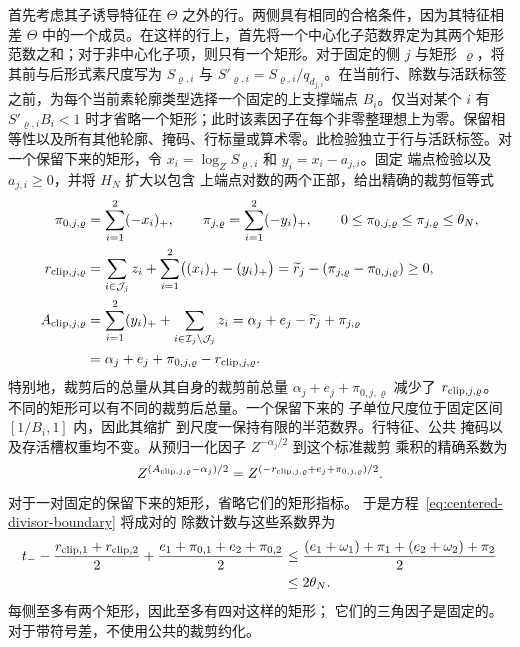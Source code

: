 \documentclass[11pt,a4paper]{article}
\numberwithin{equation}{section}
\numberwithin{figure}{section}
\theoremstyle{definition}
\theoremstyle{remark}
\begin{document}
首先考虑其子诱导特征在 \(\Theta\) 之外的行。两侧具有相同的合格条件，因为其特征相差 \(\Theta\) 中的一个成员。在这样的行上，首先将一个中心化子范数界定为其两个矩形范数之和；对于非中心化子项，则只有一个矩形。对于固定的侧 \(j\) 与矩形 \(\varrho\)，将其前与后形式素尺度写为 \(S_{\varrho,i}\) 与
\(S'_{\varrho,i}=S_{\varrho,i}/q_{d_{j,i}}\)。在当前行、除数与活跃标签之前，为每个当前素轮廓类型选择一个固定的上支撑端点 \(B_i\)。仅当对某个 \(i\) 有 \(S'_{\varrho,i}B_i<1\) 时才省略一个矩形；此时该素因子在每个非零整理想上为零。保留相等性以及所有其他轮廓、掩码、行标量或算术零。此检验独立于行与活跃标签。对一个保留下来的矩形，令
\(x_i=\log_ZS_{\varrho,i}\) 和 \(y_i=x_i-a_{j,i}\)。固定
端点检验以及 \(a_{j,i}\ge0\)，并将 \(H_N\) 扩大以包含
上端点对数的两个正部，给出精确的裁剪恒等式
\begin{equation}
 \begin{aligned}
 \pi_{0,j,\varrho}&=\sum_{i=1}^2(-x_i)_+,\qquad
 \pi_{j,\varrho}=\sum_{i=1}^2(-y_i)_+,
 \qquad 0\le\pi_{0,j,\varrho}\le\pi_{j,\varrho}\le\theta_N,\\
 r_{{\rm clip},j,\varrho}
 &=\sum_{i\in\mathcal J_j}z_i+
       \sum_{i=1}^2\bigl((x_i)_+-(y_i)_+\bigr)
 =\widetilde r_j-(\pi_{j,\varrho}-\pi_{0,j,\varrho})\ge0,\\
 A_{{\rm clip},j,\varrho}
 &=\sum_{i=1}^2(y_i)_++\sum_{i\in\mathcal I_j\setminus\mathcal J_j}z_i
 =\alpha_j+e_j-\widetilde r_j+\pi_{j,\varrho}\\
 &=\alpha_j+e_j+\pi_{0,j,\varrho}-r_{{\rm clip},j,\varrho}.
 \end{aligned}
 \label{eq:centered-clipped-rectangle}
\end{equation}
特别地，裁剪后的总量从其自身的裁剪前总量 \(\alpha_j+e_j+\pi_{0,j,\varrho}\) 减少了 \(r_{{\rm clip},j,\varrho}\)。
不同的矩形可以有不同的裁剪后总量。一个保留下来的
子单位尺度位于固定区间 \([1/B_i,1]\) 内，因此其缩扩
到尺度一保持有限的半范数界。行特征、公共
掩码以及存活槽权重均不变。从预归一化因子 \(Z^{-\alpha_j/2}\) 到这个标准裁剪
乘积的精确系数为
\[
 Z^{(A_{{\rm clip},j,\varrho}-\alpha_j)/2}
 =Z^{(-r_{{\rm clip},j,\varrho}+e_j+\pi_{0,j,\varrho})/2}.
\]
对于一对固定的保留下来的矩形，省略它们的矩形指标。
于是方程~\eqref{eq:centered-divisor-boundary} 将成对的
除数计数与这些系数界为
\begin{equation}
 \begin{split}
 t_- -\frac{r_{{\rm clip},1}+r_{{\rm clip},2}}2
     +\frac{e_1+\pi_{0,1}+e_2+\pi_{0,2}}2
 &\le\frac{(e_1+\omega_1)+\pi_1+(e_2+\omega_2)+\pi_2}{2}\\
 &\le2\theta_N.
 \end{split}
 \label{eq:centered-clipped-shell}
\end{equation}
每侧至多有两个矩形，因此至多有四对这样的矩形；
它们的三角因子是固定的。对于带符号差，不使用公共的裁剪约化。
\end{document}
